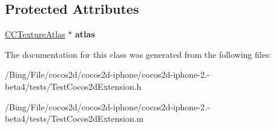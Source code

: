 \subsection*{Protected Attributes}
\begin{DoxyCompactItemize}
\item 
\hypertarget{interface_extension_test_a19df31e932f9774bfbf073a172fee698}{\hyperlink{interface_c_c_texture_atlas}{C\-C\-Texture\-Atlas} $\ast$ {\bfseries atlas}}\label{interface_extension_test_a19df31e932f9774bfbf073a172fee698}

\end{DoxyCompactItemize}


The documentation for this class was generated from the following files\-:\begin{DoxyCompactItemize}
\item 
/\-Bing/\-File/cocos2d/cocos2d-\/iphone/cocos2d-\/iphone-\/2.-\/beta4/tests/Test\-Cocos2d\-Extension.\-h\item 
/\-Bing/\-File/cocos2d/cocos2d-\/iphone/cocos2d-\/iphone-\/2.-\/beta4/tests/Test\-Cocos2d\-Extension.\-m\end{DoxyCompactItemize}
